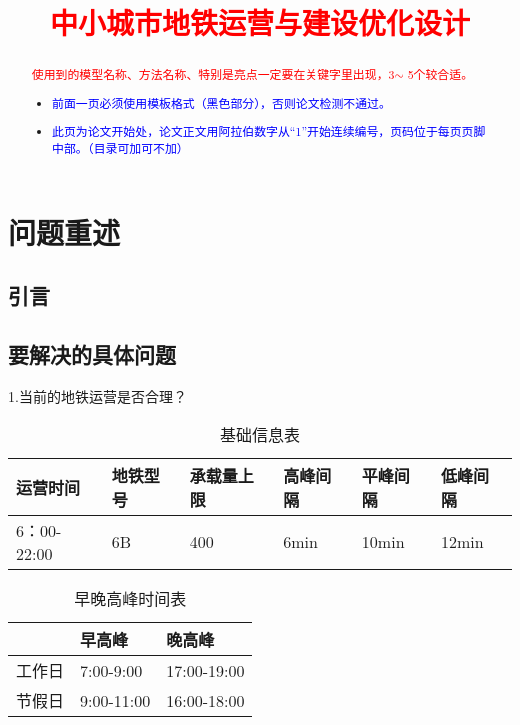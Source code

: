 \documentclass[12pt,a4paper]{mcmthesis}
\title{\textcolor{red}{中小城市地铁运营与建设优化设计}}
\date{}
\begin{document}
\begin{abstract}


\begin{keywords}
{\song\xiaosihao
\textcolor{red}{使用到的模型名称、方法名称、特别是亮点一定要在关键字里出现，3$\sim$ 5个较合适。}}
\end{keywords}

\begin{itemize}
  \item \textcolor{blue}{前面一页必须使用模板格式（黑色部分），否则论文检测不通过。}
  \item \textcolor{blue}{此页为论文开始处，论文正文用阿拉伯数字从“1”开始连续编号，页码位于每页页脚中部。（目录可加可不加）}
\end{itemize}

\end{abstract}
\maketitle
\renewcommand{\contentsname}{\centerline{\sanhao\bfseries\HEI 目\quad 录}}
\tableofcontents

\newpage
\setcounter{page}{1}
\section{问题重述}
\subsection{引言}


\subsection{要解决的具体问题}

   1.当前的地铁运营是否合理？
  
  \begin{table}
  	\centering
  	\begin{tabular}{|l|l|l|l|l|l|}
  		\hline
  		运营时间 & 地铁型号 & 承载量上限 & 高峰间隔 & 平峰间隔 & 低峰间隔 \\ \hline
  		6：00-22:00 & 6B & 400 & 6min & 10min & 12min \\ \hline
  	\end{tabular}
  	\caption{基础信息表}
  	\label{tab:基础信息表}
  \end{table}
  
   \begin{table}
  	\centering
  	\begin{tabular}{|l|l|l|}
  		\hline
  		& 早高峰 & 晚高峰 \\ \hline
  		工作日 & 7:00-9:00 & 17:00-19:00 \\ \hline
  		节假日 & 9:00-11:00 & 16:00-18:00 \\ \hline
  	\end{tabular}
  	\caption{早晚高峰时间表} 
  	\label{tab:早晚高峰}
  \end{table}
\end{document}
